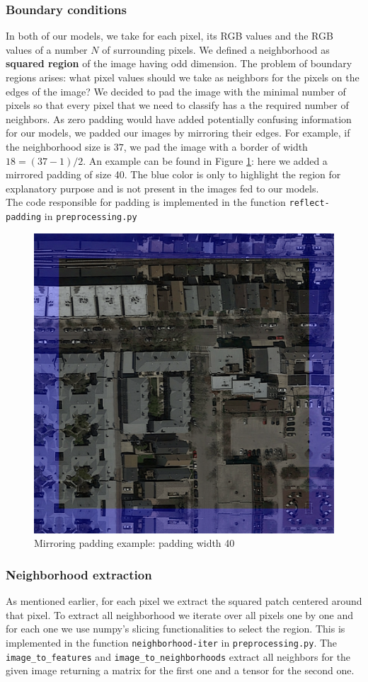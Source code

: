 \documentclass[10pt,conference,compsocconf]{IEEEtran}
\begin{document}
\subsubsection{Boundary conditions}
In both of our models, we take for each pixel, its RGB values and the RGB values of a number $N$ of surrounding pixels.
We defined a neighborhood as \textbf{squared region} of the image having odd dimension.
The problem of boundary regions arises: what pixel values should we take as neighbors for the pixels on the edges of the image? We decided to pad the image with the minimal number of pixels so that every pixel that we need to classify has a the required number of neighbors. As zero padding would have added potentially confusing information for our models, we padded our images by mirroring their edges. For example, if the neighborhood size is $37$, we pad the image with a border of width $18 = (37 - 1)/2$. An example can be found in Figure \ref{fig:padding-example}: here we added a mirrored padding of size 40. The blue color is only to highlight the region for explanatory purpose and is not present in the images fed to our models.\\ The code responsible for padding is implemented in the function \texttt{reflect-padding} in \texttt{preprocessing.py}

\begin{figure}[h]
  \centering
  \includegraphics[width=0.6\columnwidth]{padding_example-borderwidth40.png}
  \caption{Mirroring padding example: padding width 40}
  \vspace{-3mm}
  \label{fig:padding-example}
\end{figure}

\subsubsection{Neighborhood extraction}
As mentioned earlier, for each pixel we extract the squared patch centered around that pixel. To extract all neighborhood we iterate over all pixels one by one and for each one we use numpy's slicing functionalities to select the region. This is implemented in the function \texttt{neighborhood-iter} in \texttt{preprocessing.py}. The \texttt{image\_to\_features} and \texttt{image\_to\_neighborhoods} extract all neighbors for the given image returning a matrix for the first one and a tensor for the second one.
\end{document}
